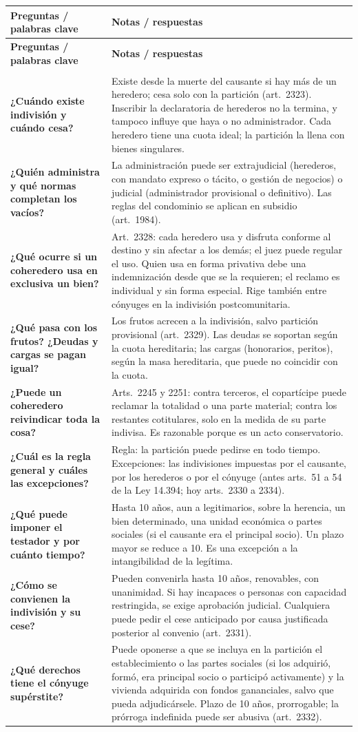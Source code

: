 \documentclass[12pt,oneside]{book}
\newenvironment{cornell}{%
    \begin{longtable}{>{\raggedright\arraybackslash}p{0.27\textwidth}
                      >{\raggedright\arraybackslash}p{0.66\textwidth}}
    \toprule
    \textbf{Preguntas / palabras clave} & \textbf{Notas / respuestas} \\
    \midrule
    \endfirsthead
    \toprule
    \textbf{Preguntas / palabras clave} & \textbf{Notas / respuestas} \\
    \midrule
    \endhead
    \midrule[0.3pt]
    \multicolumn{2}{r}{\footnotesize\textit{Continúa en la página siguiente}} \\
    \endfoot
    \endlastfoot
}{%
    \end{longtable}
}
\newcommand{\cornellrow}[2]{%
    \textbf{#1} & #2 \\
    \midrule[0.3pt]
}
\begin{document}
\begin{cornell}
\cornellrow{¿Cuándo existe indivisión y cuándo cesa?}{Existe desde la muerte del causante si hay más de un heredero; cesa solo con la partición (art.~2323). Inscribir la declaratoria de herederos no la termina, y tampoco influye que haya o no administrador. Cada heredero tiene una cuota ideal; la partición la llena con bienes singulares.}
\cornellrow{¿Quién administra y qué normas completan los vacíos?}{La administración puede ser extrajudicial (herederos, con mandato expreso o tácito, o gestión de negocios) o judicial (administrador provisional o definitivo). Las reglas del condominio se aplican en subsidio (art.~1984).}
\cornellrow{¿Qué ocurre si un coheredero usa en exclusiva un bien?}{Art.~2328: cada heredero usa y disfruta conforme al destino y sin afectar a los demás; el juez puede regular el uso. Quien usa en forma privativa debe una indemnización desde que se la requieren; el reclamo es individual y sin forma especial. Rige también entre cónyuges en la indivisión postcomunitaria.}
\cornellrow{¿Qué pasa con los frutos? ¿Deudas y cargas se pagan igual?}{Los frutos acrecen a la indivisión, salvo partición provisional (art.~2329). Las deudas se soportan según la cuota hereditaria; las cargas (honorarios, peritos), según la masa hereditaria, que puede no coincidir con la cuota.}
\cornellrow{¿Puede un coheredero reivindicar toda la cosa?}{Arts.~2245 y 2251: contra terceros, el copartícipe puede reclamar la totalidad o una parte material; contra los restantes cotitulares, solo en la medida de su parte indivisa. Es razonable porque es un acto conservatorio.}
\cornellrow{¿Cuál es la regla general y cuáles las excepciones?}{Regla: la partición puede pedirse en todo tiempo. Excepciones: las indivisiones impuestas por el causante, por los herederos o por el cónyuge (antes arts.~51 a 54 de la Ley 14.394; hoy arts.~2330 a 2334).}
\cornellrow{¿Qué puede imponer el testador y por cuánto tiempo?}{Hasta 10 años, aun a legitimarios, sobre la herencia, un bien determinado, una unidad económica o partes sociales (si el causante era el principal socio). Un plazo mayor se reduce a 10. Es una excepción a la intangibilidad de la legítima.}
\cornellrow{¿Cómo se convienen la indivisión y su cese?}{Pueden convenirla hasta 10 años, renovables, con unanimidad. Si hay incapaces o personas con capacidad restringida, se exige aprobación judicial. Cualquiera puede pedir el cese anticipado por causa justificada posterior al convenio (art.~2331).}
\cornellrow{¿Qué derechos tiene el cónyuge supérstite?}{Puede oponerse a que se incluya en la partición el establecimiento o las partes sociales (si los adquirió, formó, era principal socio o participó activamente) y la vivienda adquirida con fondos gananciales, salvo que pueda adjudicársele. Plazo de 10 años, prorrogable; la prórroga indefinida puede ser abusiva (art.~2332).}

\end{cornell}
\end{document}
